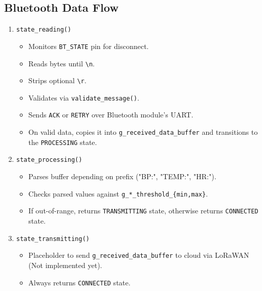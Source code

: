 \subsection{Bluetooth Data Flow}
\begin{enumerate}
	\item \lstinline|state_reading()|
	\begin{itemize}
		\item Monitors \lstinline|BT_STATE| pin for disconnect.
		\item Reads bytes until \lstinline|\n|.
		\item Strips optional \lstinline|\r|.
		\item Validates via \lstinline|validate_message()|.
		\item Sends \lstinline|ACK| or \lstinline|RETRY| over Bluetooth module's UART.
		\item On valid data, copies it into \lstinline|g_received_data_buffer| and transitions to the \lstinline|PROCESSING| state.
	\end{itemize}
	\item \lstinline|state_processing()|
	\begin{itemize}
		\item Parses buffer depending on prefix ("BP:", "TEMP:", "HR:").
		\item Checks parsed values against \lstinline|g_*_threshold_{min,max}|.
		\item If out-of-range, returns \lstinline|TRANSMITTING| state, otherwise returns \lstinline|CONNECTED| state.
	\end{itemize}
	\item \lstinline|state_transmitting()|
	\begin{itemize}
		\item Placeholder to send \lstinline|g_received_data_buffer| to cloud via LoRaWAN (Not implemented yet).
		\item Always returns \lstinline|CONNECTED| state.
	\end{itemize}
\end{enumerate}

